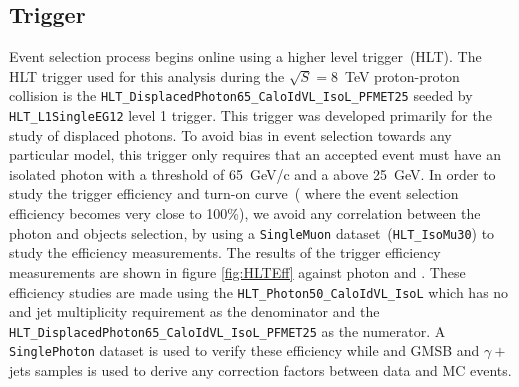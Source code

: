\subsection{Trigger}
Event selection process begins online using a higher level trigger~(HLT). The HLT trigger used for this analysis during the $\sqrt{S} = 8$~TeV proton-proton collision is the \texttt{HLT\_DisplacedPhoton65\_CaloIdVL\_IsoL\_PFMET25} seeded by \texttt{HLT\_L1SingleEG12} level 1 trigger. This trigger was developed primarily for the study of displaced photons. To avoid bias in event selection towards any particular model, this trigger only requires that an accepted event must have an isolated photon with a \pt threshold of 65~GeV/c and a \MET above 25~GeV. In order to study the trigger efficiency and turn-on curve~( where the event selection efficiency becomes very close to 100\%), we avoid  any correlation between the photon and \MET objects selection, by using a \texttt{SingleMuon} dataset~(\texttt{HLT\_IsoMu30}) to study the efficiency measurements.
The results of the trigger efficiency measurements are shown in figure \ref{fig:HLTEff} against photon \pt and \MET. These efficiency studies are made using the \texttt{HLT\_Photon50\_CaloIdVL\_IsoL} which has no \MET and jet multiplicity requirement  as the denominator and the \newline
\texttt{HLT\_DisplacedPhoton65\_CaloIdVL\_IsoL\_PFMET25} as the numerator. A \texttt{SinglePhoton} dataset is used to verify these efficiency while and GMSB and $\gamma +$ jets samples is used to derive any correction factors between data and MC events.

